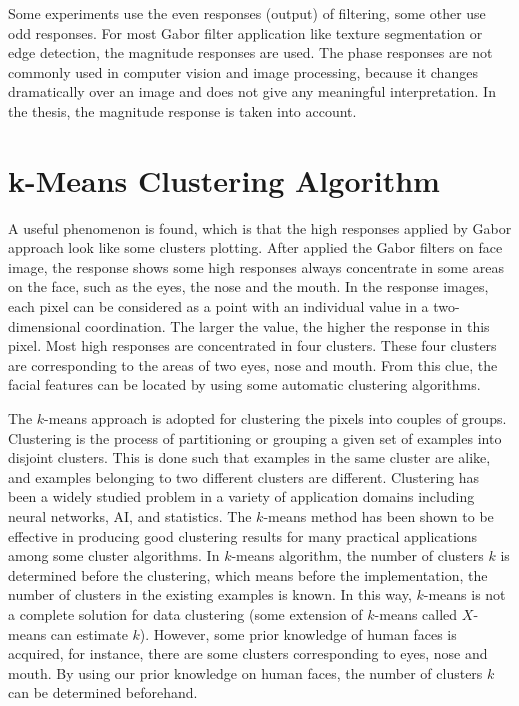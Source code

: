 Some experiments \cite{Kruger2000} use the even responses (output) of filtering, some other use odd responses. For most Gabor filter application like texture segmentation or edge detection, the magnitude responses are used. The phase responses are not commonly used in computer vision and image processing, because it changes dramatically over an image and does not give any meaningful interpretation. In the thesis, the magnitude response is taken into account.

\section{k-Means Clustering Algorithm}
A useful phenomenon is found, which is that the high responses applied by Gabor approach look like some clusters plotting. After applied the Gabor filters on face image, the response shows some high responses always concentrate in some areas on the face, such as the eyes, the nose and the mouth. In the response images, each pixel can be considered as a point with an individual value in a two-dimensional coordination. The larger the value, the higher the response in this pixel. Most high responses are concentrated in four clusters. These four clusters are corresponding to the areas of two eyes, nose and mouth. From this clue, the facial features can be located by using some automatic clustering algorithms.

The $k$-means \cite{Alsabti1998} approach is adopted for clustering the pixels into couples of groups. Clustering is the process of partitioning or grouping a given set of examples into disjoint clusters. This is done such that examples in the same cluster are alike, and examples belonging to two different clusters are different. Clustering has been a widely studied problem in a variety of application domains including neural networks, AI, and statistics. The $k$-means method has been shown to be effective in producing good clustering results for many practical applications among some cluster algorithms. In $k$-means algorithm, the number of clusters $k$ is determined before the clustering, which means before the implementation, the number of clusters in the existing examples is known. In this way, $k$-means is not a complete solution for data clustering (some extension of $k$-means called $X$-means \cite{Pelleg2000} can estimate $k$). However, some prior knowledge of human faces is acquired, for instance, there are some clusters corresponding to eyes, nose and mouth. By using our prior knowledge on human faces, the number of clusters $k$ can be determined beforehand.


